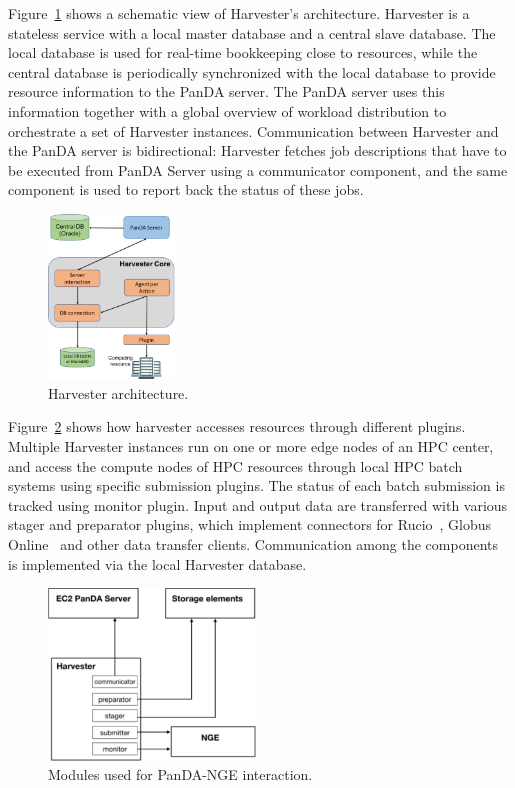 \documentclass{webofc}
\begin{document}
Figure~\ref{fig:harvester-architecture} shows a schematic view of Harvester's
architecture. Harvester is a stateless service with a local master database
and a central slave database. The local database is used for real-time
bookkeeping close to resources, while the central database is periodically
synchronized with the local database to provide resource information to the
PanDA server. The PanDA server uses this information together with a global
overview of workload distribution to orchestrate a set of Harvester
instances. Communication between Harvester and the PanDA server is
bidirectional: Harvester fetches job descriptions that have to be executed
from PanDA Server using a communicator component, and the same component is
used to report back the status of these jobs.


\begin{figure}
  \centering
  \includegraphics[width=0.30\textwidth]{figures/panda-harvester-overview-color.png}
  \caption{Harvester architecture.}
  \label{fig:harvester-architecture}
\end{figure}

Figure~\ref{fig:harvester-modules} shows how harvester accesses resources
through different plugins. Multiple Harvester instances run on one or more
edge nodes of an HPC center, and access the compute nodes of HPC resources
through local HPC batch systems using specific submission plugins. The status
of each batch submission is tracked using monitor plugin. Input and output
data are transferred with various stager and preparator plugins, which
implement connectors for Rucio~\cite{garonne2014rucio}, Globus
Online~\cite{foster2011globus} and other data transfer clients. Communication
among the components is implemented via the local Harvester database.

\begin{figure}
  \centering
  \includegraphics[width=0.49\textwidth]{figures/panda-harvester-modules.pdf}
  \caption{Modules used for PanDA-NGE interaction.}
  \label{fig:harvester-modules}
\end{figure}
\end{document}
